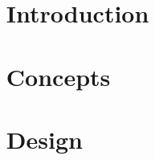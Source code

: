 \chapter{\dabc~ Introduction}
 \cleardoublepage
\chapter{\dabc~ Concepts}
 \cleardoublepage
\chapter{\dabc~ Design}
 \cleardoublepage
